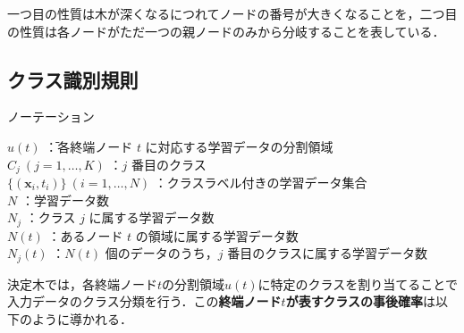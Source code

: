 \documentclass[dvipdfmx]{jreport}
\begin{document}
一つ目の性質は木が深くなるにつれてノードの番号が大きくなることを，二つ目の性質は各ノードがただ一つの親ノードのみから分岐することを表している．

\subsection{クラス識別規則}
\begin{itembox}[l]{\large{ノーテーション}}
    \begin{tabbing}
        \hspace{15pt} \raisebox{0.5ex}{\tiny $\bullet$} $u(t)$ \hspace{87pt}\=：各終端ノード $t$ に対応する学習データの分割領域\\[0.5em]
        \hspace{15pt} \raisebox{0.5ex}{\tiny $\bullet$} $C_j \ (j = 1, \dots, K)$ \>：$j$ 番目のクラス\\[0.5em]
        \hspace{15pt} \raisebox{0.5ex}{\tiny $\bullet$} $\{ (\bm{x}_i, t_i) \} \ (i = 1, \dots, N)$ \>：クラスラベル付きの学習データ集合\\[0.5em]
        \hspace{15pt} \raisebox{0.5ex}{\tiny $\bullet$} $N$ \>：学習データ数\\[0.5em]
        \hspace{15pt} \raisebox{0.5ex}{\tiny $\bullet$} $N_j$ \>：クラス $j$ に属する学習データ数\\[0.5em]
        \hspace{15pt} \raisebox{0.5ex}{\tiny $\bullet$} $N(t)$ \>：あるノード $t$ の領域に属する学習データ数\\[0.5em]
        \hspace{15pt} \raisebox{0.5ex}{\tiny $\bullet$} $N_j(t)$ \>：$N(t)$ 個のデータのうち，$j$ 番目のクラスに属する学習データ数
    \end{tabbing}
\end{itembox}

決定木では，各終端ノード$t$の分割領域$u(t)$に特定のクラスを割り当てることで入力データのクラス分類を行う．この\textbf{終端ノード$t$が表すクラスの事後確率}は以下のように導かれる．
\end{document}
